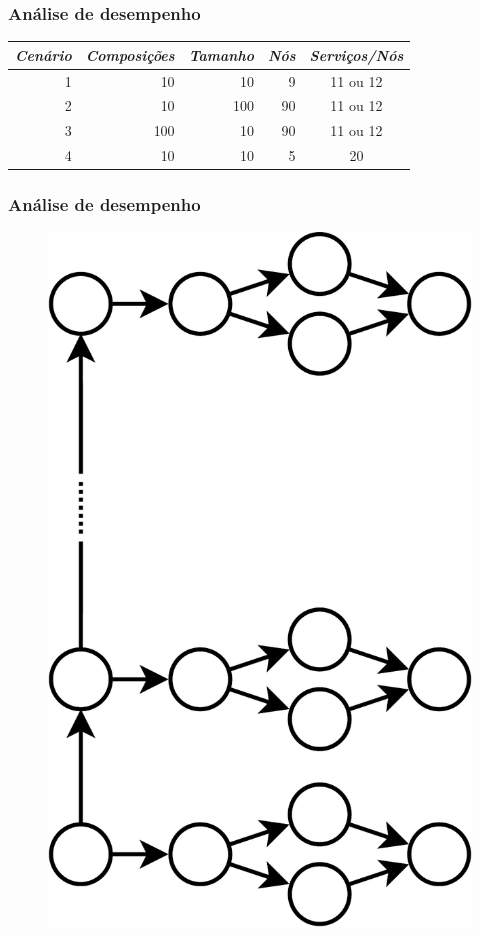 \documentclass{beamer}
\begin{document}
\begin{frame}
\frametitle{Análise de desempenho}

\begin{table}
\centering
\begin{tabular}{r r r r c} \hline
\emph{Cenário} & \emph{Composições} & \emph{Tamanho} & \emph{Nós} & \emph{Serviços/Nós} \\ \hline
1 &  10 &  10 &  9 & 11 ou 12 \\
2 &  10 & 100 & 90 & 11 ou 12 \\
3 & 100 &  10 & 90 & 11 ou 12 \\
4 &  10 &  10 &  5 &       20 \\
\hline \end{tabular}
\end{table}

\end{frame}



\begin{frame}
\frametitle{Análise de desempenho}

\begin{figure}
\includegraphics[width=0.35\linewidth, angle=270]{img/eval_composition}
\end{figure}

\end{frame}


\end{document}
